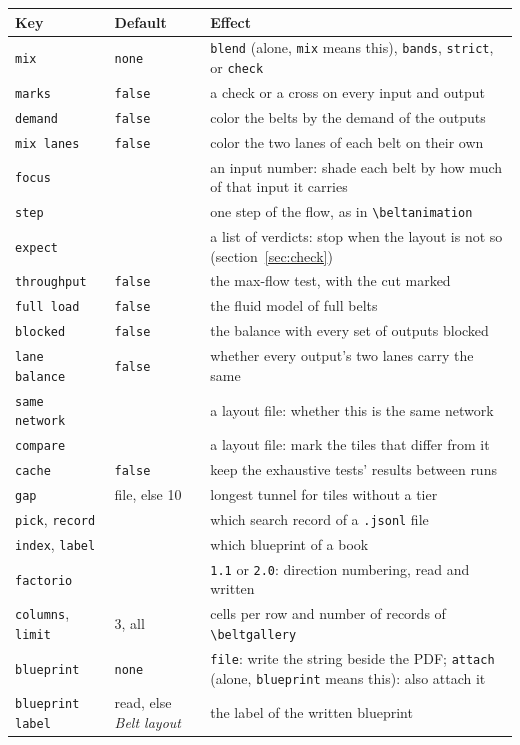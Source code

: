 \documentclass[11pt]{article}
\newcommand\cs[1]{\texttt{\textbackslash#1}}
\newcommand\key[1]{\texttt{#1}}
\begin{document}
	\begin{tabularx}{\linewidth}{@{}l l X@{}}
		\toprule
		Key & Default & Effect \\
		\midrule
		\key{mix} & \key{none} & \key{blend} (alone, \key{mix} means this), \key{bands}, \key{strict}, or \key{check} \\
		\key{marks} & \key{false} & a check or a cross on every input and output \\
		\key{demand} & \key{false} & color the belts by the demand of the outputs \\
		\key{mix lanes} & \key{false} & color the two lanes of each belt on their own \\
		\key{focus} & & an input number: shade each belt by how much of that input it carries \\
		\key{step} & & one step of the flow, as in \cs{beltanimation} \\
		\key{expect} & & a list of verdicts: stop when the layout is not so (section~\ref{sec:check}) \\
		\key{throughput} & \key{false} & the max-flow test, with the cut marked \\
		\key{full load} & \key{false} & the fluid model of full belts \\
		\key{blocked} & \key{false} & the balance with every set of outputs blocked \\
		\key{lane balance} & \key{false} & whether every output's two lanes carry the same \\
		\key{same network} & & a layout file: whether this is the same network \\
		\key{compare} & & a layout file: mark the tiles that differ from it \\
		\key{cache} & \key{false} & keep the exhaustive tests' results between runs \\
		\key{gap} & file, else 10 & longest tunnel for tiles without a tier \\
		\key{pick}, \key{record} & & which search record of a \texttt{.jsonl} file \\
		\key{index}, \key{label} & & which blueprint of a book \\
		\key{factorio} & & \key{1.1} or \key{2.0}: direction numbering, read and written \\
		\key{columns}, \key{limit} & 3, all & cells per row and number of records of \cs{beltgallery} \\
		\key{blueprint} & \key{none} & \key{file}: write the string beside the PDF; \key{attach} (alone, \key{blueprint} means this): also attach it \\
		\key{blueprint label} & read, else \emph{Belt layout} & the label of the written blueprint \\
		\bottomrule
	\end{tabularx}
\end{document}
